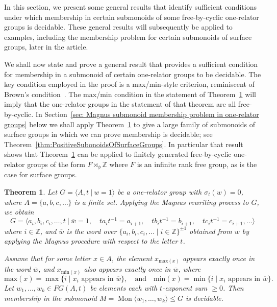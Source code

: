 \documentclass[11pt]{amsart}
\newcommand{\Mgen}[1]{\operatorname{Mon}\bigl\langle #1 \bigr\rangle}
\newcommand{\Gpres}[2]{\bigl\langle #1\:|\:#2 \bigr\rangle}
\newcommand{\Z}{\mathbb{Z}}
\theoremstyle{plain}
\newtheorem{theorem}{Theorem}[section]
\theoremstyle{definition}
\begin{document}
In this section, we present some general results that identify sufficient conditions under which membership in certain submonoids of some free-by-cyclic one-relator groups is decidable. These general results will subsequently be applied to examples, including the membership problem for certain submonoids of surface groups, later in the article.

We shall now state and prove a general result that provides a sufficient condition for membership in a submonoid of certain one-relator groups to be decidable. The key condition employed in the proof is a max/min-style criterion, reminiscent of Brown's condition~\cite{Brown1987}. The max/min condition in the statement of Theorem~\ref{thm: exponent_sum_one_relator2:NewCorrected} will imply that the one-relator groups in the statement of that theorem are all free-by-cyclic. In Section~\ref{sec: Magnus submonoid membership problem in one-relator groups} below we shall apply Theorem~\ref{thm: exponent_sum_one_relator2:NewCorrected} to give a large family of submonoids of surface groups in which we can prove membership is decidable; see Theorem~\ref{thm:PositiveSubonoidsOfSurfaceGroups}. In particular that result shows that Theorem~\ref{thm: exponent_sum_one_relator2:NewCorrected} can be applied to finitely generated free-by-cyclic one-relator groups of the form $F \rtimes_\phi  \Z $ where $F$ is an infinite rank free group, as is the case for surface groups.    




\begin{theorem}\label{thm: exponent_sum_one_relator2:NewCorrected}
Let $G = \Gpres{A, t}{w = 1}$ be a one-relator group with $\sigma_t(w) = 0$, where $A = \{a, b, c, \ldots\}$ is a finite set. Applying the Magnus rewriting process to $G$, we obtain  
\[
G = \Gpres{a_i, b_i, c_i, \ldots, t}{
\overline{w} = 1, \quad
t a_i t^{-1} = a_{i+1}, \quad
t b_i t^{-1} = b_{i+1}, \quad
t c_i t^{-1} = c_{i+1}, \ldots
}  
\]
where $i \in \mathbb{Z}$, and $\overline{w}$ is the word over $\{a_i, b_i, c_i, \ldots \mid i \in \mathbb{Z}\}^{\pm 1}$ obtained from $w$ by applying the Magnus procedure with respect to the letter $t$. 

Assume that for some letter $x \in A$, the element $x_{\mathrm{max}(x)}$ appears exactly once in the word $\overline{w}$, and $x_{\mathrm{min}(x)}$ also appears exactly once in $\overline{w}$, where 
\[
\mathrm{max}(x) = \max\{ i \mid x_i \text{ appears in } \overline{w} \}, 
\quad \text{and} \quad  
\mathrm{min}(x) = \min\{ i \mid x_i \text{ appears in } \overline{w} \}. 
\]
Let $w_1, \ldots, w_k \in FG(A, t)$ be elements each with $t$-exponent sum $\geq 0$. Then membership in the submonoid $M = \Mgen{w_1, \ldots, w_k} \leqslant G$ is decidable.
\end{theorem}
\end{document}
